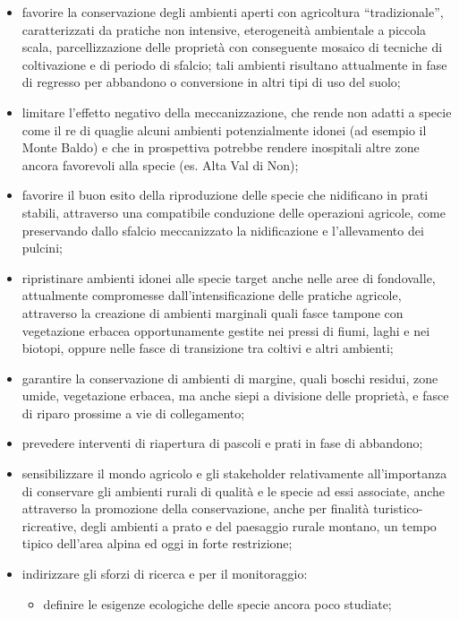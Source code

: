 \documentclass[10pt,twoside,openany,x11names,svgnames,italian,a5paper,dvipsnames,table]{memoir}
\begin{document}
\begin{itemize}\itemsep0pt
  \item favorire la conservazione degli ambienti aperti con agricoltura “tradizionale”, caratterizzati da pratiche non intensive, eterogeneità ambientale a piccola scala, parcellizzazione delle proprietà con conseguente mosaico di tecniche di coltivazione e di periodo di sfalcio; tali ambienti risultano attualmente in fase di regresso per abbandono o conversione in altri tipi di uso del suolo;
  \item limitare l'effetto negativo della meccanizzazione, che rende non adatti a specie come il re di quaglie alcuni ambienti potenzialmente idonei (ad esempio il Monte Baldo) e che in prospettiva potrebbe rendere inospitali altre zone ancora favorevoli alla specie (es. Alta Val di Non);
  \item favorire il buon esito della riproduzione delle specie che nidificano in prati stabili, attraverso una compatibile conduzione delle operazioni agricole, come preservando dallo sfalcio meccanizzato la nidificazione e l’allevamento dei pulcini;
  \item ripristinare ambienti idonei alle specie target anche nelle aree di fondovalle, attualmente compromesse dall’intensificazione delle pratiche agricole, attraverso la creazione di ambienti marginali quali fasce tampone con vegetazione erbacea opportunamente gestite nei pressi di fiumi, laghi e nei biotopi, oppure nelle fasce di transizione tra coltivi e altri ambienti;
  \item garantire la conservazione di ambienti di margine, quali boschi residui, zone umide, vegetazione erbacea, ma anche siepi a divisione delle proprietà, e fasce di riparo prossime a vie di collegamento;
  \item prevedere interventi di riapertura di pascoli e prati in fase di abbandono;
  \item sensibilizzare il mondo agricolo e gli stakeholder relativamente all’importanza di conservare gli ambienti rurali di qualità e le specie ad essi associate, anche attraverso la promozione della conservazione, anche per finalità turistico-ricreative, degli ambienti a prato e del paesaggio rurale montano, un tempo tipico dell’area alpina ed oggi in forte restrizione;
  \item indirizzare gli sforzi di ricerca e per il monitoraggio:
  \begin{itemize}\itemsep0pt
    \item definire le esigenze ecologiche delle specie ancora poco studiate;

\end{itemize}
\end{itemize}
\end{document}

